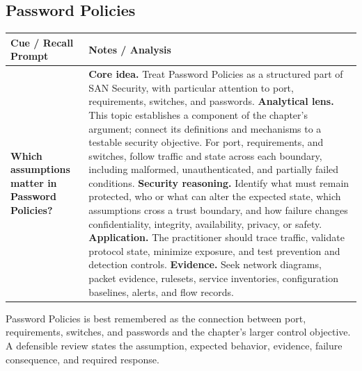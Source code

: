 \documentclass[11pt]{article}
\newcommand{\CornellHeader}{%
\rowcolor{Navy}\color{white}\bfseries Cue / Recall Prompt & \color{white}\bfseries Notes / Analysis\\\hline}
\newcommand{\CornellRow}[2]{%
\cellcolor{CueGray}\RaggedRight\textbf{#1} & \RaggedRight #2\\\hline}
\begin{document}
\subsection*{Password Policies}
\begin{longtable}{>{\RaggedRight\arraybackslash}p{}|>{\RaggedRight\arraybackslash}p{}}
\CornellHeader
\CornellRow{Which assumptions matter in Password Policies?}{\textbf{Core idea.} Treat Password Policies as a structured part of SAN Security, with particular attention to port, requirements, switches, and passwords. \textbf{Analytical lens.} This topic establishes a component of the chapter's argument; connect its definitions and mechanisms to a testable security objective. For port, requirements, and switches, follow traffic and state across each boundary, including malformed, unauthenticated, and partially failed conditions. \textbf{Security reasoning.} Identify what must remain protected, who or what can alter the expected state, which assumptions cross a trust boundary, and how failure changes confidentiality, integrity, availability, privacy, or safety. \textbf{Application.} The practitioner should trace traffic, validate protocol state, minimize exposure, and test prevention and detection controls. \textbf{Evidence.} Seek network diagrams, packet evidence, rulesets, service inventories, configuration baselines, alerts, and flow records.}
\end{longtable}
\begin{topicsummary}
Password Policies is best remembered as the connection between port, requirements, switches, and passwords and the chapter's larger control objective. A defensible review states the assumption, expected behavior, evidence, failure consequence, and required response.
\end{topicsummary}
\end{document}
